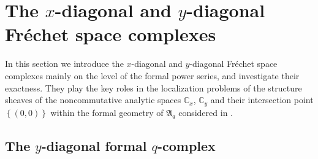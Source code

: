 \documentclass[12pt,reqno]{amsart}%
\theoremstyle{plain}
\numberwithin{theorem}{section} \numberwithin{equation}{section}
\numberwithin{lemma}{section}
\numberwithin{remark}{section}
\numberwithin{example}{section}
\numberwithin{proposition}{section}
\numberwithin{definition}{section}
\numberwithin{corollary}{section}
\begin{document}
\section{The $x$-diagonal and $y$-diagonal Fr\'{e}chet space
complexes\label{sectionLRq}}

In this section we introduce the $x$-diagonal and $y$-diagonal Fr\'{e}chet
space complexes mainly on the level of the formal power series, and
investigate their exactness. They play the key roles in the localization
problems of the structure sheaves of the noncommutative analytic spaces
$\mathbb{C}_{x}$, $\mathbb{C}_{y}$ and their intersection point $\left\{
\left(  0,0\right)  \right\}  $ within the formal geometry of $\mathfrak{A}%
_{q}$ considered in \cite{Dosi25}.

\subsection{The $y$-diagonal formal $q$-complex\label{subsecLDFC}}
\end{document}
